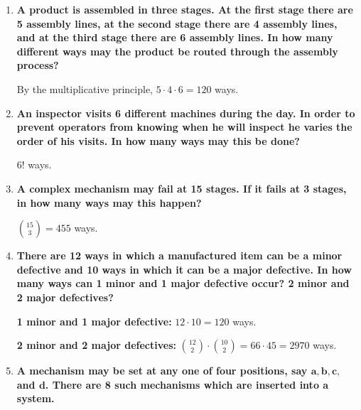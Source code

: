 \documentclass[10pt, oneside]{article}
\begin{document}
\begin{enumerate}[label=2.\arabic*]
\begin{enumerate}
  \[ \frac{6}{16} \cdot \frac{5}{15} = \boxed{1/8} \]
	\end{enumerate}
\item \begin{tcolorbox}[
  colback=Cerulean!5!white,
  colframe=Cerulean!75!black]
  \textbf{A product is assembled in three stages. At the first stage there are 5 assembly lines, at the second stage there are 4 assembly lines, and at the third stage there are 6 assembly lines. In how many different ways may the product be routed through the assembly process?}
  \end{tcolorbox}
  
  By the multiplicative principle, $5 \cdot 4 \cdot 6 = \boxed{120}$ ways.
\item \begin{tcolorbox}[
  colback=Cerulean!5!white,
  colframe=Cerulean!75!black]
  \textbf{An inspector visits 6 different machines during the day. In order to prevent operators from knowing when he will inspect he varies the order of his visits. In how many ways may this be done?}
  \end{tcolorbox}
  
  $\boxed{6!}$ ways.
\item \begin{tcolorbox}[
  colback=Cerulean!5!white,
  colframe=Cerulean!75!black]
  \textbf{A complex mechanism may fail at 15 stages. If it fails at 3 stages, in how many ways may this happen?}
  \end{tcolorbox}
  
  $\binom{15}{3} = \boxed{455}$ ways.

\item \begin{tcolorbox}[
  colback=Cerulean!5!white,
  colframe=Cerulean!75!black]
  \textbf{There are 12 ways in which a manufactured item can be a minor defective and 10 ways in which it can be a major defective. In how many ways can 1 minor and 1 major defective occur? 2 minor and 2 major defectives?}
  \end{tcolorbox}
  
  \textbf{1 minor and 1 major defective:} $12 \cdot 10 = \boxed{120}$ ways.
  
  \textbf{2 minor and 2 major defectives:} $\binom{12}{2} \cdot \binom{10}{2} = 66 \cdot 45 = \boxed{2970}$ ways.

\item \begin{tcolorbox}[
  colback=Cerulean!5!white,
  colframe=Cerulean!75!black]
  \textbf{A mechanism may be set at any one of four positions, say $\bm{a,b,c,}$ and $\bm{d}$. There are 8 such mechanisms which are inserted into a system.}
  \end{tcolorbox}
  

\end{enumerate}
\end{document}
